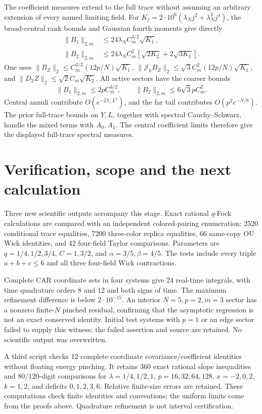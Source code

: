 \documentclass[11pt,a4paper]{article}
\newcommand{\Jh}{\mathcal J_h}
\begin{document}
The coefficient measures extend to the full trace without assuming
an arbitrary extension of every named limiting field. For
$K_j=2\cdot10^6(\lambda_Nj^2+\lambda_N^2j^4)$, the broad-central
rank bounds and Gaussian fourth moments give directly
\begin{align}
 \|B_1\|_{2,m}&\le24\lambda_N C_m^{3/2}\sqrt{K_1},\\
 \|B_2\|_{2,m}&\le24\lambda_N C_m^2
                       [\sqrt{2K_2}+2\sqrt{3K_1}].
\end{align}
One uses $\|B_Z\|_2\le C_m^{3/2}(12p/N)\sqrt{K_1}$,
$\|\Jh B_Z\|_2\le\sqrt3 C_m^2(12p/N)\sqrt{K_1}$, and
$\|D_2Z\|_2\le\sqrt2 C_m\sqrt{K_2}$.
All active sectors have the coarser bounds
\begin{equation}
 \|B_1\|_{2,m}\le2pC_m^{3/2},\qquad
 \|B_2\|_{2,m}\le6\sqrt3 pC_m^2.
\end{equation}
Central annuli contribute $O(e^{-2\lambda_-L^2})$, and the far
tail contributes $O(p^2e^{-N/8})$. The prior full-trace bounds on
$Y,L$, together with spectral Cauchy--Schwarz, handle the mixed
terms with $A_0,A_1$. The central coefficient limits therefore give
the displayed full-trace spectral measures.

\newpage
\section{Verification, scope and the next calculation}
Three new scientific outputs accompany this stage.
Exact rational $q$-Fock calculations are compared with an independent
colored-pairing enumeration: 2520 conditional trace equalities,
7200 three-color replica equalities, 66 same-copy OU Wick identities,
and 42 four-field Taylor comparisons. Parameters are
$q=1/4,1/2,3/4$, $C=1,3/2$, and $\alpha=3/5,\beta=4/5$.
The tests include every triple $a+b+c\le6$ and all three
four-field Wick contractions.

Complete CAR coordinate sets in four systems give 24 real-time
integrals, with time quadrature orders 8 and 12 and both signs of
time. The maximum refinement difference is below $2\cdot10^{-15}$.
An interior $N=5,p=2,m=3$ sector has a nonzero finite-$N$ pinched
residual, confirming that the asymptotic regression is not an exact
conserved identity. Initial test systems with $p=1$ or an edge
sector failed to supply this witness; the failed assertion and
source are retained. No scientific output was overwritten.

A third script checks 12 complete-coordinate covariance/coefficient
identities without floating energy pinching. It retains 360 exact
rational slope inequalities and 80/120-digit comparisons for
$\lambda=1/4,1/2,1$, $p=16,32,64,128$, $x=-2,0,2$, $k=1,2$,
and deficits $0,1,2,3,6$. Relative finite-size errors are retained.
These computations check finite identities and conventions; the
uniform limits come from the proofs above. Quadrature refinement
is not interval certification.
\end{document}
